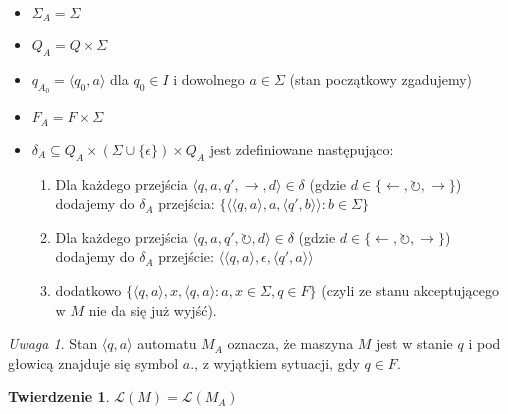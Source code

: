 \documentclass{article}
\newtheorem{theorem}{Twierdzenie}[section]
\theoremstyle{definition}
\theoremstyle{remark}
\newtheorem{remark}{Uwaga}[section]
\begin{document}
\begin{itemize}
\item $\Sigma_A = \Sigma$
\item $Q_A = Q \times \Sigma$ 
\item $q_{A_0} = \langle q_0, a \rangle$ dla $q_0 \in I$ i dowolnego $a \in \Sigma$ (stan początkowy zgadujemy)
\item $F_A = F \times \Sigma$
\item $\delta_A \subseteq Q_A \times (\Sigma \cup \{\epsilon\}) \times Q_A$ jest zdefiniowane następująco:
\begin{enumerate}
    \item Dla każdego przejścia $\langle q, a, q', \rightarrow, d \rangle \in \delta$ (gdzie $d \in \{\leftarrow, \circlearrowright, \rightarrow\}$) dodajemy do $\delta_A$ przejścia: 
    $\{\langle \langle q,a \rangle, a, \langle q',b \rangle \rangle : b \in \Sigma\}$
    
    \item Dla każdego przejścia $\langle q, a, q', \circlearrowright, d \rangle \in \delta$ (gdzie $d \in \{\leftarrow, \circlearrowright, \rightarrow\}$) dodajemy do $\delta_A$ przejście:
    $\langle \langle q,a \rangle, \epsilon, \langle q',a \rangle \rangle$

    \item dodatkowo $\{ \langle q, a \rangle, x, \langle q, a \rangle: a, x \in \Sigma, q \in F \}$ (czyli ze stanu akceptującego w \(M\) nie da się już wyjść).
\end{enumerate}
\end{itemize}

\begin{remark}\label{remark:transition}
    Stan $\langle q,a \rangle$ automatu $M_A$ oznacza, że maszyna $M$ jest w stanie $q$ i pod głowicą znajduje się symbol $a$., z wyjątkiem sytuacji, gdy \(q \in F\).
\end{remark}

\begin{theorem}
$\mathcal{L}(M) = \mathcal{L}(M_A)$
\end{theorem}
\end{document}

